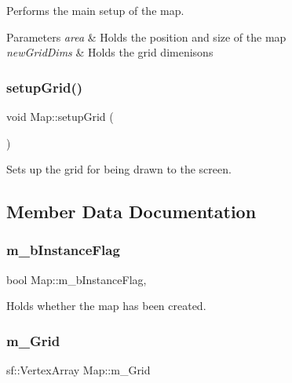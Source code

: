 Performs the main setup of the map. 


\begin{DoxyParams}{Parameters}
{\em area} & Holds the position and size of the map \\
\hline
{\em new\+Grid\+Dims} & Holds the grid dimenisons \\
\hline
\end{DoxyParams}
\mbox{\label{class_map_ae54d2487832069ead9901a5291faca1d}} 
\subsubsection{\texorpdfstring{setup\+Grid()}{setupGrid()}}
{\footnotesize\ttfamily void Map\+::setup\+Grid (\begin{DoxyParamCaption}{ }\end{DoxyParamCaption})}



Sets up the grid for being drawn to the screen. 



\subsection{Member Data Documentation}
\mbox{\label{class_map_a2f2bb4f55b0eb2faf7db0b7242b46d3c}} 
\subsubsection{\texorpdfstring{m\+\_\+b\+Instance\+Flag}{m\_bInstanceFlag}}
{\footnotesize\ttfamily bool Map\+::m\+\_\+b\+Instance\+Flag\hspace{0.3cm}{\ttfamily [static]}, {\ttfamily [private]}}



Holds whether the map has been created. 

\mbox{\label{class_map_ae156d7efcaaf7b84e0ef4422d407af94}} 
\subsubsection{\texorpdfstring{m\+\_\+\+Grid}{m\_Grid}}
{\footnotesize\ttfamily sf\+::\+Vertex\+Array Map\+::m\+\_\+\+Grid\hspace{0.3cm}{\ttfamily [private]}}



